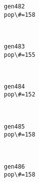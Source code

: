 \documentclass[11pt]{article}
\begin{document}
    \begin{Verbatim}[commandchars=\\\{\}]
gen482
pop\#=158

    \end{Verbatim}

    \begin{center}
    \end{center}
    { \hspace*{\fill} \\}
    
    \begin{Verbatim}[commandchars=\\\{\}]
gen483
pop\#=155

    \end{Verbatim}

    \begin{center}
    \end{center}
    { \hspace*{\fill} \\}
    
    \begin{Verbatim}[commandchars=\\\{\}]
gen484
pop\#=152

    \end{Verbatim}

    \begin{center}
    \end{center}
    { \hspace*{\fill} \\}
    
    \begin{Verbatim}[commandchars=\\\{\}]
gen485
pop\#=158

    \end{Verbatim}

    \begin{center}
    \end{center}
    { \hspace*{\fill} \\}
    
    \begin{Verbatim}[commandchars=\\\{\}]
gen486
pop\#=158

    \end{Verbatim}
\end{document}
